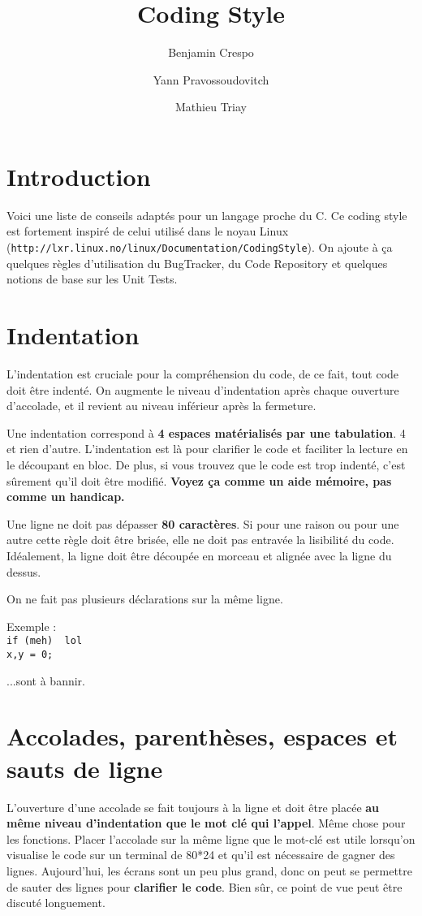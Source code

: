 \documentclass[a4paper, titlepage, oneside]{book}
\title{Coding Style}           %
\author{Benjamin Crespo\and Yann Pravossoudovitch \and Mathieu Triay}
\begin{document}
\maketitle                

\chapter{Introduction}

Voici une liste de conseils adaptés pour un langage proche du C. Ce coding style est fortement inspiré de celui utilisé dans le noyau Linux (\texttt{http://lxr.linux.no/linux/Documentation/CodingStyle}). On ajoute à ça quelques règles d'utilisation du BugTracker, du Code Repository et quelques notions de base sur les Unit Tests.

\chapter{Indentation}

L'indentation est cruciale pour la compréhension du code, de ce fait, tout code doit être indenté. On augmente le niveau d'indentation après chaque ouverture d'accolade, et il revient au niveau inférieur après la fermeture.

Une indentation correspond à \textbf{4 espaces matérialisés par une tabulation}. 4 et rien d'autre. L'indentation est là pour clarifier le code et faciliter la lecture en le découpant en bloc. De plus, si vous trouvez que le code est trop indenté, c'est sûrement qu'il doit être modifié. \textbf{Voyez ça comme un aide mémoire, pas comme un handicap.}
 
Une ligne ne doit pas dépasser \textbf{80 caractères}. Si pour une raison ou pour une autre cette règle doit être brisée, elle ne doit pas entravée la lisibilité du code. Idéalement, la ligne doit être découpée en morceau et alignée avec la ligne du dessus.

On ne fait pas plusieurs déclarations sur la même ligne.

Exemple :\\
\texttt{if (meh) { lol }\\
x,y = 0;}

...sont à bannir.

\chapter{Accolades, parenthèses, espaces et sauts de ligne}

L'ouverture d'une accolade se fait toujours à la ligne et doit être placée \textbf{au même niveau d'indentation que le mot clé qui l'appel}. Même chose pour les fonctions. Placer l'accolade sur la même ligne que le mot-clé est utile lorsqu'on visualise le code sur un terminal de 80*24 et qu'il est nécessaire de gagner des lignes. Aujourd'hui, les écrans sont un peu plus grand, donc on peut se permettre de sauter des lignes pour \textbf{clarifier le code}. Bien sûr, ce point de vue peut être discuté longuement.
\end{document}
